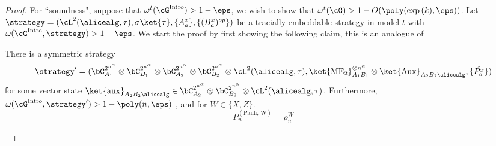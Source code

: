 \begin{proof}
	For ``soundness", suppose that $\omega^t(\cG^{\text{Intro}}) > 1 - \eps$, we wish to show that $\omega^t(\cG) > 1 - O(\poly(\exp{(k)}, \eps))$. Let $\strategy = (\cL^2(\alicealg, \tau), \sigma \ket{\tau}, \{ A_{a}^x \}, \{ (B_{a}^x)^{op} \})$	be a tracially embeddable strategy in model $t$ with $\omega(\cG^{\text{Intro}}, \strategy) > 1 -\eps$. We start the proof by first showing the following claim, this is an analogue of~\cite[Lemma 8.19]{jiMIPRE2022a}
	\begin{lemma}
		There is a symmetric strategy
		\begin{equation*}
			\strategy' =  (\bC^{2^{n^{\alpha}}}_{A_1} \otimes \bC^{2^{n^{\alpha}}}_{B_1} \otimes \bC^{2^{n^{\alpha}}}_{A_2} \otimes \bC^{2^{n^{\alpha}}}_{B_2} \otimes  \cL^2(\alicealg, \tau), \ket{\text{ME}_2}^{\otimes n^{\alpha}}_{A_1 B_1} \otimes \ket{\text{Aux}}_{A_2 B_2 \alicealg},\{\hat{P^x_a} \})
		\end{equation*}
		for some vector state $\ket{\text{aux}}_{A_2 B_2 \alicealg} \in \bC^{2^{n^{\alpha}}}_{A_2} \otimes \bC^{2^{n^{\alpha}}}_{B_2} \otimes  \cL^2(\alicealg, \tau)$. Furthermore, $\omega(\cG^{\text{Intro}}, \strategy') > 1 - \poly(n,\eps)$ , and for $W \in \{X,Z\}$. 
		\begin{equation}
			P^{(\text{Pauli, W})}_{u} = \rho^{W}_u
		\end{equation}
	\end{lemma}
	

\end{proof}
